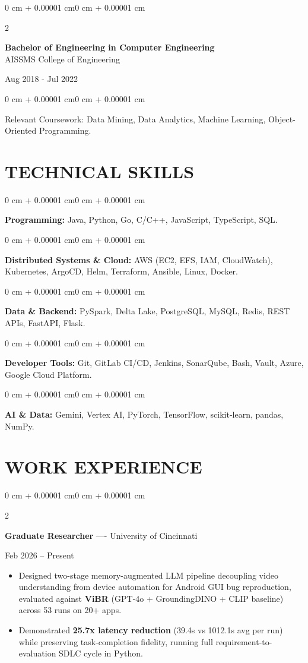 \documentclass[10pt, letterpaper]{article}
\newenvironment{highlights}{
    \begin{itemize}[
        topsep=0.10 cm,
        parsep=0.06 cm,
        partopsep=0pt,
        itemsep=0.06 cm,
        leftmargin=12pt
    ]
}{
    \end{itemize}
}
\newenvironment{onecolentry}{
    \begin{adjustwidth}{0 cm + 0.00001 cm}{0 cm + 0.00001 cm}
}{
    \end{adjustwidth}
}
\newenvironment{twocolentry}[2][]{
    \onecolentry
    \def\secondColumn{#2}
    \setcolumnwidth{\fill, 4.5 cm}
    \begin{paracol}{2}
}{
    \switchcolumn \raggedleft \secondColumn
    \end{paracol}
    \endonecolentry
}
\begin{document}
\begin{twocolentry}{
    Aug 2018 - Jul 2022
}
    \textbf{Bachelor of Engineering in Computer Engineering} \\
    AISSMS College of Engineering
\end{twocolentry}
\begin{onecolentry}
Relevant Coursework: Data Mining, Data Analytics, Machine Learning, Object-Oriented Programming.
\end{onecolentry}
\section{TECHNICAL SKILLS}
\begin{onecolentry}
\textbf{Programming:} Java, Python, Go, C/C++, JavaScript, TypeScript, SQL.
\end{onecolentry}
\vspace{0.06 cm}
\begin{onecolentry}
\textbf{Distributed Systems \& Cloud:} AWS (EC2, EFS, IAM, CloudWatch), Kubernetes, ArgoCD, Helm, Terraform, Ansible, Linux, Docker.
\end{onecolentry}
\vspace{0.06 cm}
\begin{onecolentry}
\textbf{Data \& Backend:} PySpark, Delta Lake, PostgreSQL, MySQL, Redis, REST APIs, FastAPI, Flask.
\end{onecolentry}
\vspace{0.06 cm}
\begin{onecolentry}
\textbf{Developer Tools:} Git, GitLab CI/CD, Jenkins, SonarQube, Bash, Vault, Azure, Google Cloud Platform.
\end{onecolentry}
\vspace{0.06 cm}
\begin{onecolentry}
\textbf{AI \& Data:} Gemini, Vertex AI, PyTorch, TensorFlow, scikit-learn, pandas, NumPy.
\end{onecolentry}

\section{WORK EXPERIENCE}
\begin{twocolentry}{Feb 2026 -- Present}
\textbf{Graduate Researcher} ---- University of Cincinnati
\end{twocolentry}
\begin{highlights}
  \item Designed two-stage memory-augmented LLM pipeline decoupling video understanding from device automation for Android GUI bug reproduction, evaluated against \textbf{ViBR} (GPT-4o + GroundingDINO + CLIP baseline) across 53 runs on 20+ apps.
  \item Demonstrated \textbf{25.7x latency reduction} (39.4s vs 1012.1s avg per run) while preserving task-completion fidelity, running full requirement-to-evaluation SDLC cycle in Python.
\end{highlights}
\end{document}
